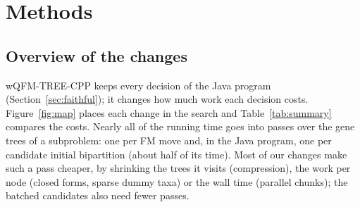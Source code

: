 \documentclass[11pt,a4paper]{article}
\newcommand{\cpp}{wQFM-TREE-CPP}
\begin{document}
\section{Methods}\label{sec:methods}

\subsection{Overview of the changes}\label{sec:overview}

\cpp{} keeps every decision of the Java program (Section~\ref{sec:faithful}); it changes how much
work each decision costs. Figure~\ref{fig:map} places each change in the search and
Table~\ref{tab:summary} compares the costs. Nearly all of the running time goes into passes over
the gene trees of a subproblem: one per FM move and, in the Java program, one per candidate initial
bipartition (about half of its time). Most of our changes make such a pass cheaper, by shrinking the
trees it visits (compression), the work per node (closed forms, sparse dummy taxa) or the wall time
(parallel chunks); the batched candidates also need fewer passes.
\end{document}
